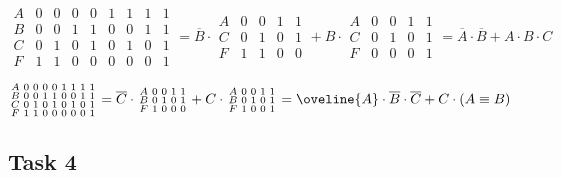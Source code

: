 \documentclass[a4paper,10pt]{article} %
\begin{document}
	\begin{equation}
		\begin{smallmatrix}
			A & 0 & 0 & 0 & 0 & 1 & 1 & 1 & 1 \\
			B & 0 & 0 & 1 & 1 & 0 & 0 & 1 & 1 \\
			C & 0 & 1 & 0 & 1 & 0 & 1 & 0 & 1 \\
			F & 1 & 1 & 0 & 0 & 0 & 0 & 0 & 1
		\end{smallmatrix}
		= \overline{B} \cdot
		\begin{smallmatrix}
			A & 0 & 0 & 1 & 1 \\
			C & 0 & 1 & 0 & 1 \\
			F & 1 & 1 & 0 & 0 
		\end{smallmatrix}
		+ B \cdot
		\begin{smallmatrix}
			A & 0 & 0 & 1 & 1 \\
			C & 0 & 1 & 0 & 1 \\
			F & 0 & 0 & 0 & 1
		\end{smallmatrix}
		= \overline{A} \cdot \overline{B} + A \cdot B \cdot C
	\end{equation}

	\begin{equation}
		\begin{smallmatrix}
			A & 0 & 0 & 0 & 0 & 1 & 1 & 1 & 1 \\
			B & 0 & 0 & 1 & 1 & 0 & 0 & 1 & 1 \\
			C & 0 & 1 & 0 & 1 & 0 & 1 & 0 & 1 \\
			F & 1 & 1 & 0 & 0 & 0 & 0 & 0 & 1
		\end{smallmatrix}
		= \overline{C} \cdot 
		\begin{smallmatrix}
			A & 0 & 0 & 1 & 1 \\
			B & 0 & 1 & 0 & 1 \\
			F & 1 & 0 & 0 & 0
		\end{smallmatrix}
		+ C \cdot
		\begin{smallmatrix}
			A & 0 & 0 & 1 & 1 \\
			B & 0 & 1 & 0 & 1 \\
			F & 1 & 0 & 0 & 1
		\end{smallmatrix}
		= \oveline{A} \cdot \overline{B} \cdot \overline{C} + C \cdot (A \equiv B) 
	\end{equation}
	
	\subsection{Task 4}
	
\end{document}
